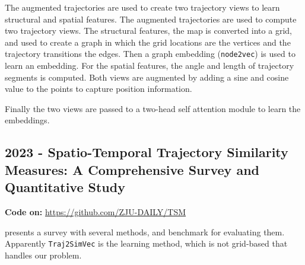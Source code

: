 The augmented trajectories are used to create two trajectory views to learn structural and spatial features. The augmented trajectories are used to compute two trajectory views.
%
The structural features, the map is converted into a grid, and used to create a graph in which the grid locations are the vertices and the trajectory transitions the edges. Then a graph embedding (\texttt{node2vec}) is used to learn an embedding.
%
For the spatial features, the angle and length of trajectory segments is computed.
%
Both views are augmented by adding a  sine and cosine value to the points to capture position information.

Finally the two views are passed to a two-head self attention module to learn the embeddings.


\subsection*{2023 - Spatio-Temporal Trajectory Similarity Measures: A Comprehensive Survey and Quantitative Study}

\textbf{Code on:} \url{https://github.com/ZJU-DAILY/TSM}

\cite{hu2023spatio} presents a survey with several methods, and benchmark for evaluating them. Apparently \texttt{Traj2SimVec} \cite{zhang2020trajectory} is the learning method, which is not grid-based that handles our problem.